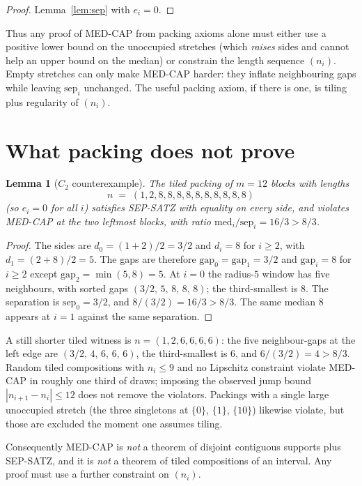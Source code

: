 \documentclass[11pt]{article}
\newtheorem{lemma}{Lemma}
\theoremstyle{remark}
\begin{document}
\begin{proof}
Lemma~\ref{lem:sep} with $e_i=0$.
\end{proof}

Thus any proof of MED-CAP from packing axioms alone must either
use a positive lower bound on the unoccupied stretches (which
\emph{raises} sides and cannot help an upper bound on the median)
or constrain the length sequence $(n_i)$.  Empty stretches can
only make MED-CAP harder: they inflate neighbouring gaps while
leaving $\mathrm{sep}_i$ unchanged.  The useful packing axiom,
if there is one, is tiling plus regularity of $(n_i)$.

\section{What packing does not prove}\label{sec:c2}

\begin{lemma}[$C_2$ counterexample]\label{lem:c2}
The tiled packing of $m=12$ blocks with lengths
\[
n \;=\; (1,2,8,8,8,8,8,8,8,8,8,8)
\]
(so $e_i=0$ for all $i$) satisfies SEP-SATZ with equality on every
side, and violates MED-CAP at the two leftmost blocks, with ratio
$\mathrm{med}_i/\mathrm{sep}_i=16/3>8/3$.
\end{lemma}

\begin{proof}
The sides are $d_0=(1+2)/2=3/2$ and $d_i=8$ for $i\ge 2$, with
$d_1=(2+8)/2=5$.  The gaps are therefore
$\mathrm{gap}_0=\mathrm{gap}_1=3/2$ and $\mathrm{gap}_i=8$ for
$i\ge 2$ except $\mathrm{gap}_2=\min(5,8)=5$.  At $i=0$ the
radius-$5$ window has five neighbours, with sorted gaps
$(3/2,\,5,\,8,\,8,\,8)$; the third-smallest is $8$.
The separation is $\mathrm{sep}_0=3/2$, and $8/(3/2)=16/3>8/3$.
The same median $8$ appears at $i=1$ against the same separation.
\end{proof}

A still shorter tiled witness is $n=(1,2,6,6,6,6)$: the five
neighbour-gaps at the left edge are $(3/2,\,4,\,6,\,6,\,6)$, the
third-smallest is $6$, and $6/(3/2)=4>8/3$.  Random tiled
compositions with $n_i\le 9$ and no Lipschitz constraint violate
MED-CAP in roughly one third of draws; imposing the observed
jump bound $|n_{i+1}-n_i|\le 12$ does not remove the violators.
Packings with a single large unoccupied stretch (the three
singletons at $\{0\}$, $\{1\}$, $\{10\}$) likewise violate, but
those are excluded the moment one assumes tiling.

Consequently MED-CAP is \emph{not} a theorem of disjoint contiguous
supports plus SEP-SATZ, and it is \emph{not} a theorem of tiled
compositions of an interval.  Any proof must use a further
constraint on $(n_i)$.
\end{document}
